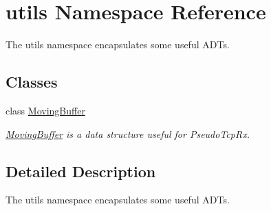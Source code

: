 \hypertarget{namespaceutils}{
\section{utils Namespace Reference}
\label{namespaceutils}
}


The utils namespace encapsulates some useful ADTs.  


\subsection*{Classes}
\begin{DoxyCompactItemize}
\item 
class \hyperlink{classutils_1_1MovingBuffer}{MovingBuffer}
\begin{DoxyCompactList}\small\item\em \hyperlink{classutils_1_1MovingBuffer}{MovingBuffer} is a data structure useful for PseudoTcpRx. \item\end{DoxyCompactList}\end{DoxyCompactItemize}


\subsection{Detailed Description}
The utils namespace encapsulates some useful ADTs. 
